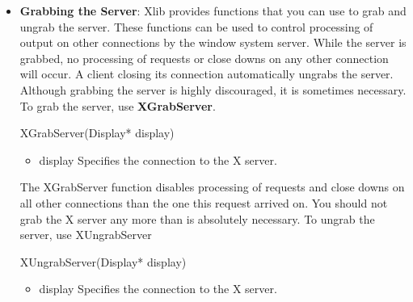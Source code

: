 \documentclass{report}
\begin{document}
\begin{itemize}
\begin{itemize}
                \item npaths\_return Returns the number of strings in the font path array.
            \end{itemize}
            To free data returned by XGetFontPath, use XFreeFontPath
            \bigbreak \noindent 
            \begin{cppcode}
            XFreeFontPath(char** list)
            \end{cppcode}
            \bigbreak \noindent
            \begin{itemize}
                \item list Specifies the array of strings you want to free.
            \end{itemize}
            The XFreeFontPath function frees the data allocated by XGetFontPath
        \item \textbf{Grabbing the Server}: Xlib provides functions that you can use to grab and ungrab the server. These functions can be used to control processing of output on other connections by the window system server. While the server is grabbed, no processing of requests or close downs on any other connection will occur. A client closing its connection automatically ungrabs the server. Although grabbing the server is highly discouraged, it is sometimes necessary.
            \bigbreak \noindent 
            To grab the server, use \textbf{XGrabServer}.
            \bigbreak \noindent 
            \begin{cppcode}
                XGrabServer(Display* display)
            \end{cppcode}
            \bigbreak \noindent
            \begin{itemize}
                \item display Specifies the connection to the X server.
            \end{itemize}
            The XGrabServer function disables processing of requests and close downs on all other connections than the one this request arrived on. You should not grab the X server any more than is absolutely necessary.
            \bigbreak \noindent 
            To ungrab the server, use XUngrabServer
            \bigbreak \noindent 
            \begin{cppcode}
                XUngrabServer(Display* display)
            \end{cppcode}
            \bigbreak \noindent
            \begin{itemize}
                \item display Specifies the connection to the X server.

\end{itemize}
\end{itemize}
\end{document}
